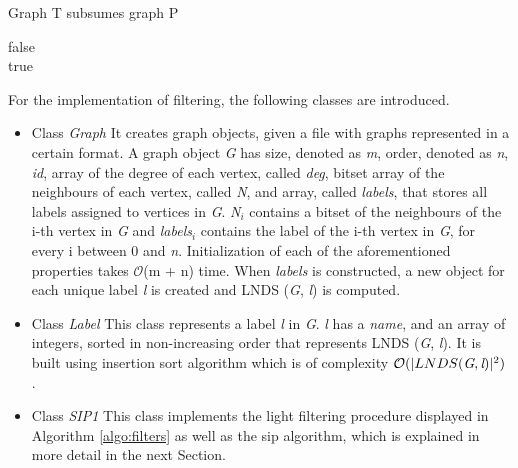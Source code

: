 \documentclass{l4proj}
\begin{document}
\begin{algorithm}
\centering
\caption{Graph T subsumes graph P}
\label{algo:subsumes}
\begin{algorithmic}[1]
		 \Return false
		\EndIf
	\EndFor
\EndFor \\
\Return true
\EndProcedure
\end{algorithmic}
\end{algorithm}
For the implementation of filtering, the following classes are introduced.

\begin{itemize}
\item Class \emph{Graph}
It creates graph objects, given a file with graphs represented in a certain format. A graph object \emph{G} has size, denoted as \emph{m}, order, denoted as \emph{n}, \emph{id}, array of the degree of each vertex, called \emph{deg}, bitset array of the neighbours of each vertex, called \emph{N}, and array, called \emph{labels}, that stores all labels assigned to vertices in \emph{G}. \emph{N}$_{i}$ contains a bitset of the neighbours of the i-th vertex in \emph{G} and \emph{labels}$_{i}$ contains the label of the i-th vertex in \emph{G}, for every i between 0 and \emph{n}. Initialization of each of the aforementioned properties takes $\mathcal{O}$(m + n) time. When \emph{labels} is constructed, a new object for each unique label \emph{l} is created and LNDS (\emph{G}, \emph{l}) is computed.

\item Class \emph{Label}
This class represents a label \emph{l} in \emph{G}. \emph{l} has a \emph{name}, and an array of integers, sorted in non-increasing order that represents LNDS (\emph{G}, \emph{l}). It is built using insertion sort algorithm which is of complexity $\mathcal{O}(|LNDS (\emph{G}, \emph{l})|^{2})$ \cite{Cormen:2001:IA:580470}.

\item Class \emph{SIP1}
This class implements the light filtering procedure displayed in Algorithm \ref{algo:filters} as well as the \gls{sip} algorithm, which is explained in more detail in the next Section.
\end{itemize}
\end{document}
